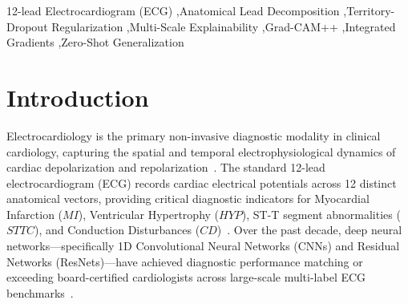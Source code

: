 \documentclass[12pt]{elsarticle}
\begin{document}
\begin{frontmatter}
\begin{abstract}
\textbf{0.7849}, Normal Sinus Rhythm = \textbf{0.9049}).
\end{abstract}



\begin{keyword}
12-lead Electrocardiogram (ECG) \sep Anatomical Lead Decomposition \sep Territory-Dropout Regularization \sep Multi-Scale Explainability \sep Grad-CAM++ \sep Integrated Gradients \sep Zero-Shot Generalization
\end{keyword}

\end{frontmatter}

\section{Introduction}
\label{sec:intro}

Electrocardiology is the primary non-invasive diagnostic modality in clinical cardiology, capturing the spatial and temporal electrophysiological dynamics of cardiac depolarization and repolarization~\cite{strodthoff2020deep}. The standard 12-lead electrocardiogram (ECG) records cardiac electrical potentials across 12 distinct anatomical vectors, providing critical diagnostic indicators for Myocardial Infarction ($MI$), Ventricular Hypertrophy ($HYP$), ST-T segment abnormalities ($STTC$), and Conduction Disturbances ($CD$)~\cite{wagner2020ptb}. Over the past decade, deep neural networks---specifically 1D Convolutional Neural Networks (CNNs) and Residual Networks (ResNets)---have achieved diagnostic performance matching or exceeding board-certified cardiologists across large-scale multi-label ECG benchmarks~\cite{ribeiro2020automatic, hannun2019cardiologist}.
\end{document}

